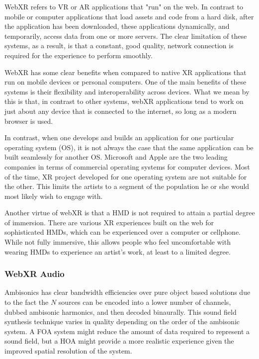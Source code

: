 WebXR refers to VR or AR applications that "run" on the web. In contrast to mobile or computer applications that load assets and code from a hard disk, after the application has been downloaded, these applications dynamically, and temporarily, access data from one or more servers. The clear limitation of these systems, as a result, is that a constant, good quality, network connection is required for the experience to perform smoothly. 

WebXR has some clear benefits when compared to native XR applications that run on mobile devices or personal computers. One of the main benefits of these systems is their flexibility and interoperability across devices. What we mean by this is that, in contrast to other systems, webXR applications tend to work on just about any device that is connected to the internet, so long as a modern browser is used. 

In contrast, when one develops and builds an application for one particular operating system (OS), it is not always the case that the same application can be built seamlessly for another OS. Microsoft and Apple are the two leading companies in terms of commercial operating systems for computer devices. Most of the time, XR project developed for one operating system are not suitable for the other. This limits the artists to a segment of the population he or she would most likely wish to engage with.

Another virtue of webXR is that a HMD is not required to attain a partial degree of immersion. There are various XR experiences built on the web for sophisticated HMDs, which can be experienced over a computer or cellphone. While not fully immersive, this allows people who feel uncomfortable with wearing HMDs to experience an artist's work, at least to a limited degree. 

\subsubsection{WebXR Audio}

Ambisonics has clear bandwidth efficiencies over pure object based solutions due to the fact the $N$ sources can be encoded into a lower number of channels, dubbed ambisonic harmonics, and then decoded binaurally. This sound field synthesis technique varies in quality depending on the order of the ambisonic system. A FOA system might reduce the amount of data required to represent a sound field, but a HOA might provide a more realistic experience given the improved spatial resolution of the system.

